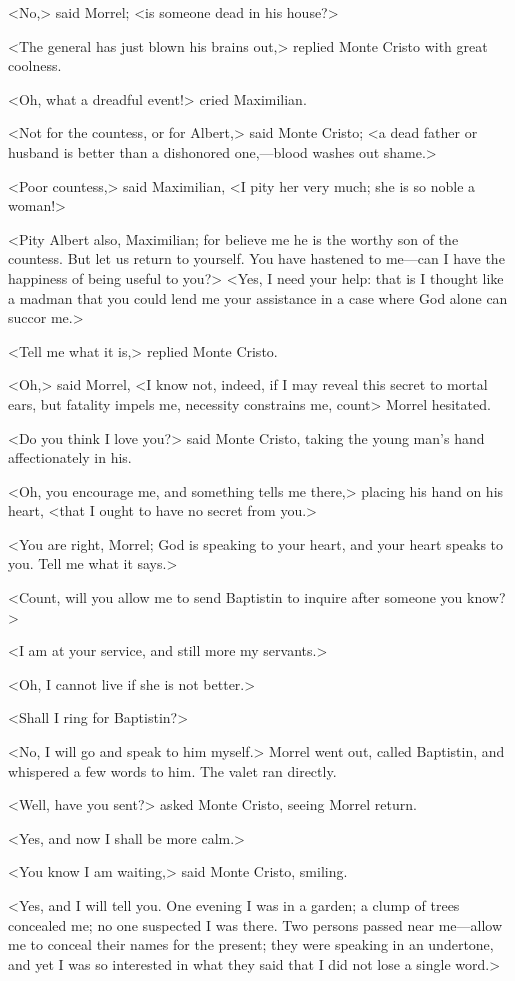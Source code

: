  <No,> said Morrel; <is someone dead in his house?> 

 <The general has just blown his brains out,> replied Monte Cristo with great coolness. 

 <Oh, what a dreadful event!> cried Maximilian. 

 <Not for the countess, or for Albert,> said Monte Cristo; <a dead father or husband is better than a dishonored one,—blood washes out shame.> 

 <Poor countess,> said Maximilian, <I pity her very much; she is so noble a woman!> 

 <Pity Albert also, Maximilian; for believe me he is the worthy son of the countess. But let us return to yourself. You have hastened to me—can I have the happiness of being useful to you?>  <Yes, I need your help: that is I thought like a madman that you could lend me your assistance in a case where God alone can succor me.> 

 <Tell me what it is,> replied Monte Cristo. 

 <Oh,> said Morrel, <I know not, indeed, if I may reveal this secret to mortal ears, but fatality impels me, necessity constrains me, count\longdash> Morrel hesitated. 

 <Do you think I love you?> said Monte Cristo, taking the young man's hand affectionately in his. 

 <Oh, you encourage me, and something tells me there,> placing his hand on his heart, <that I ought to have no secret from you.> 

 <You are right, Morrel; God is speaking to your heart, and your heart speaks to you. Tell me what it says.> 

 <Count, will you allow me to send Baptistin to inquire after someone you know?> 

 <I am at your service, and still more my servants.> 

 <Oh, I cannot live if she is not better.> 

 <Shall I ring for Baptistin?> 

 <No, I will go and speak to him myself.> Morrel went out, called Baptistin, and whispered a few words to him. The valet ran directly. 

 <Well, have you sent?> asked Monte Cristo, seeing Morrel return. 

 <Yes, and now I shall be more calm.> 

 <You know I am waiting,> said Monte Cristo, smiling. 

 <Yes, and I will tell you. One evening I was in a garden; a clump of trees concealed me; no one suspected I was there. Two persons passed near me—allow me to conceal their names for the present; they were speaking in an undertone, and yet I was so interested in what they said that I did not lose a single word.> 

